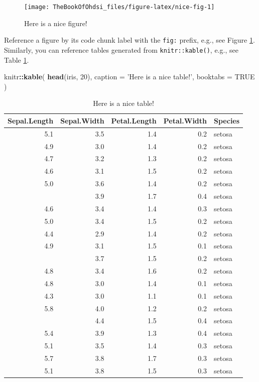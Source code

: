 \documentclass[]{book}
\newenvironment{Shaded}{\begin{snugshade}}{\end{snugshade}}
\newcommand{\KeywordTok}[1]{\textcolor[rgb]{0.13,0.29,0.53}{\textbf{#1}}}
\newcommand{\DataTypeTok}[1]{\textcolor[rgb]{0.13,0.29,0.53}{#1}}
\newcommand{\DecValTok}[1]{\textcolor[rgb]{0.00,0.00,0.81}{#1}}
\newcommand{\StringTok}[1]{\textcolor[rgb]{0.31,0.60,0.02}{#1}}
\newcommand{\OtherTok}[1]{\textcolor[rgb]{0.56,0.35,0.01}{#1}}
\newcommand{\OperatorTok}[1]{\textcolor[rgb]{0.81,0.36,0.00}{\textbf{#1}}}
\newcommand{\NormalTok}[1]{#1}
\begin{document}
\begin{figure}

{\centering \texttt{[image: TheBookOfOhdsi\_files/figure-latex/nice-fig-1]} 

}

\caption{Here is a nice figure!}\label{fig:nice-fig}
\end{figure}

Reference a figure by its code chunk label with the \texttt{fig:}
prefix, e.g., see Figure \ref{fig:nice-fig}. Similarly, you can
reference tables generated from \texttt{knitr::kable()}, e.g., see Table
\ref{tab:nice-tab}.

\begin{Shaded}
\begin{Highlighting}[]
\NormalTok{knitr}\OperatorTok{::}\KeywordTok{kable}\NormalTok{(}
  \KeywordTok{head}\NormalTok{(iris, }\DecValTok{20}\NormalTok{), }\DataTypeTok{caption =} \StringTok{'Here is a nice table!'}\NormalTok{,}
  \DataTypeTok{booktabs =} \OtherTok{TRUE}
\NormalTok{)}
\end{Highlighting}
\end{Shaded}

\begin{table}[t]

\caption{\label{tab:nice-tab}Here is a nice table!}
\centering
\begin{tabular}{rrrrl}
\toprule
Sepal.Length & Sepal.Width & Petal.Length & Petal.Width & Species\\
\midrule
5.1 & 3.5 & 1.4 & 0.2 & setosa\\
4.9 & 3.0 & 1.4 & 0.2 & setosa\\
4.7 & 3.2 & 1.3 & 0.2 & setosa\\
4.6 & 3.1 & 1.5 & 0.2 & setosa\\
5.0 & 3.6 & 1.4 & 0.2 & setosa\\
\addlinespace
5.4 & 3.9 & 1.7 & 0.4 & setosa\\
4.6 & 3.4 & 1.4 & 0.3 & setosa\\
5.0 & 3.4 & 1.5 & 0.2 & setosa\\
4.4 & 2.9 & 1.4 & 0.2 & setosa\\
4.9 & 3.1 & 1.5 & 0.1 & setosa\\
\addlinespace
5.4 & 3.7 & 1.5 & 0.2 & setosa\\
4.8 & 3.4 & 1.6 & 0.2 & setosa\\
4.8 & 3.0 & 1.4 & 0.1 & setosa\\
4.3 & 3.0 & 1.1 & 0.1 & setosa\\
5.8 & 4.0 & 1.2 & 0.2 & setosa\\
\addlinespace
5.7 & 4.4 & 1.5 & 0.4 & setosa\\
5.4 & 3.9 & 1.3 & 0.4 & setosa\\
5.1 & 3.5 & 1.4 & 0.3 & setosa\\
5.7 & 3.8 & 1.7 & 0.3 & setosa\\
5.1 & 3.8 & 1.5 & 0.3 & setosa\\
\bottomrule
\end{tabular}
\end{table}
\end{document}
